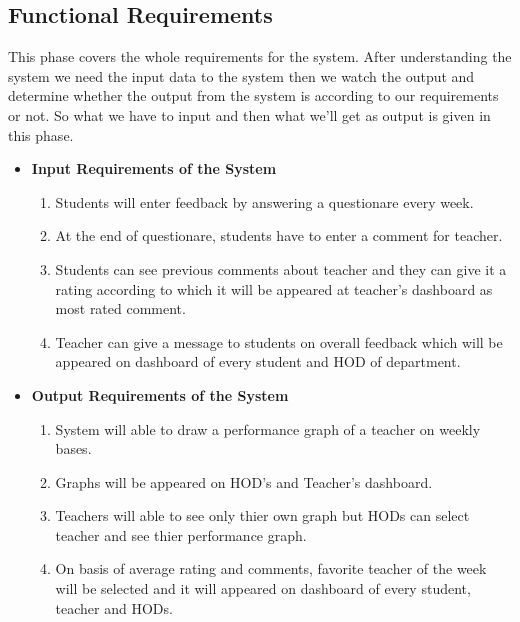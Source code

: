 \subsection{Functional Requirements}
This phase covers the whole requirements for the system. After 
understanding the system we need the input data to the system then we 
watch the output and determine whether the output from the system is 
according to our requirements or not. So what we have to input and 
then what we’ll get as output is given in this phase.
\begin{itemize}
    \item{\bf Input Requirements of the System}
        \begin{enumerate}
            \item Students will enter feedback by answering a 
                questionare every week.
            \item At the end of questionare, students have to enter a 
                comment for teacher.
            \item Students can see previous comments about teacher and 
                they can give it a rating according to which it will be 
                appeared at teacher's dashboard as most rated comment.
            \item Teacher can give a message to students on overall 
                feedback which will be appeared on dashboard of every 
                student and HOD of department.
        \end{enumerate}
    \item{\bf Output Requirements of the System}
        \begin{enumerate}
            \item System will able to draw a performance graph of a
                teacher on weekly bases.
            \item Graphs will be appeared on HOD's and Teacher's dashboard.
            \item Teachers will able to see only thier own graph but HODs
                can select teacher and see thier performance graph.
            \item On basis of average rating and comments, favorite 
                teacher of the week will be selected and it will appeared
                on dashboard of every student, teacher and HODs.
        \end{enumerate}
\end{itemize}

